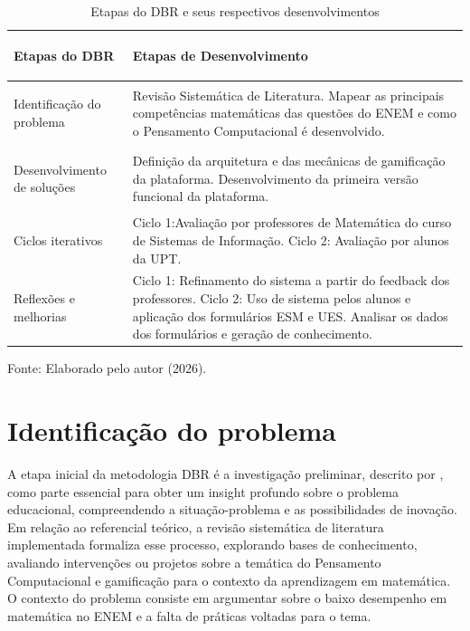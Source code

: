 \documentclass{abnt}
\begin{document}
\renewcommand{\tablename}{Quadro}
\renewcommand{\arraystretch}{1.5} 
\begin{longtable}{ | >{\bfseries\raggedright\arraybackslash}p{4.0cm} |
    >{\raggedright\arraybackslash}p{10.5cm} |} \caption{Etapas do DBR e seus
    respectivos desenvolvimentos} \label{quadro:dbr} \\
    \hline
    \normalfont\bfseries Etapas do DBR & \normalfont\bfseries Etapas de
    Desenvolvimento \\
    \hline    \endhead
 
    Identificação do problema & Revisão Sistemática de Literatura. Mapear as
    principais competências matemáticas das questões do ENEM e como o Pensamento
    Computacional é desenvolvido. \\
    \hline
 
    Desenvolvimento de soluções & Definição da arquitetura e das mecânicas de
    gamificação da plataforma. Desenvolvimento da primeira versão funcional da
    plataforma. \\
    \hline
 
    Ciclos iterativos & Ciclo 1:Avaliação por professores de Matemática do curso
    de Sistemas de Informação. Ciclo 2: Avaliação por alunos da UPT.\\
    \hline
 
    Reflexões e melhorias & Ciclo 1: Refinamento do sistema a partir do feedback
    dos professores. Ciclo 2: Uso de sistema pelos alunos e aplicação dos
    formulários ESM e UES. Analisar os dados dos formulários e geração de
    conhecimento. \\
    \hline
\end{longtable}

\begin{center}
    \vspace{-0.5cm}
    {\small Fonte: Elaborado pelo autor (2026).}
\end{center}

\section{Identificação do problema}
\sloppy

A etapa inicial da metodologia DBR é a investigação preliminar, descrito por
\cite{obrien2018practical}, como parte essencial para obter um insight profundo
sobre o problema educacional, compreendendo a situação-problema e as
possibilidades de inovação. Em relação ao referencial teórico, a revisão
sistemática de literatura implementada formaliza esse processo, explorando bases
de conhecimento, avaliando intervenções ou projetos sobre a temática do
Pensamento Computacional e gamificação para o contexto da aprendizagem em
matemática. O contexto do problema consiste em argumentar sobre o baixo
desempenho em matemática no ENEM e a falta de práticas voltadas para o tema.
\end{document}
